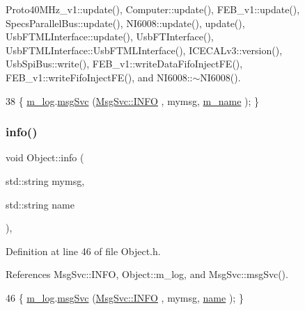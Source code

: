 Proto40\+M\+Hz\+\_\+v1\+::update(), Computer\+::update(), F\+E\+B\+\_\+v1\+::update(), Specs\+Parallel\+Bus\+::update(), N\+I6008\+::update(), update(), Usb\+F\+T\+M\+L\+Interface\+::update(), Usb\+F\+T\+Interface(), Usb\+F\+T\+M\+L\+Interface\+::\+Usb\+F\+T\+M\+L\+Interface(), I\+C\+E\+C\+A\+Lv3\+::version(), Usb\+Spi\+Bus\+::write(), F\+E\+B\+\_\+v1\+::write\+Data\+Fifo\+Inject\+F\+E(), F\+E\+B\+\_\+v1\+::write\+Fifo\+Inject\+F\+E(), and N\+I6008\+::$\sim$\+N\+I6008().


\begin{DoxyCode}
38 \{ \hyperlink{classObject_a0d269813dd7ac1f24bc143031e2963f2}{m\_log}.\hyperlink{classMsgSvc_ad25f18047920cc59a314e5098259711c}{msgSvc} (\hyperlink{classMsgSvc_ae671eb7301996cd049d2da8a65925926ad2fcf3f3e734fc41ee097cc23670ce51}{MsgSvc::INFO}    , mymsg, \hyperlink{classObject_a8b83c95c705d2c3ba0d081fe1710f48d}{m\_name} ); \}
\end{DoxyCode}
\mbox{\label{classObject_a1ca123253dfd30fc28b156f521dcbdae}} 
\subsubsection{\texorpdfstring{info()}{info()}\hspace{0.1cm}{\footnotesize\ttfamily [2/2]}}
{\footnotesize\ttfamily void Object\+::info (\begin{DoxyParamCaption}\item[{std\+::string}]{mymsg,  }\item[{std\+::string}]{name }\end{DoxyParamCaption})\hspace{0.3cm}{\ttfamily [inline]}, {\ttfamily [inherited]}}



Definition at line 46 of file Object.\+h.



References Msg\+Svc\+::\+I\+N\+FO, Object\+::m\+\_\+log, and Msg\+Svc\+::msg\+Svc().


\begin{DoxyCode}
46 \{ \hyperlink{classObject_a0d269813dd7ac1f24bc143031e2963f2}{m\_log}.\hyperlink{classMsgSvc_ad25f18047920cc59a314e5098259711c}{msgSvc} (\hyperlink{classMsgSvc_ae671eb7301996cd049d2da8a65925926ad2fcf3f3e734fc41ee097cc23670ce51}{MsgSvc::INFO}    , mymsg, \hyperlink{classObject_a300f4c05dd468c7bb8b3c968868443c1}{name} ); \}
\end{DoxyCode}
\mbox{\label{classUsbFTInterface_a5371fe7b447850599eaec81a0ffa2ba0}} 
